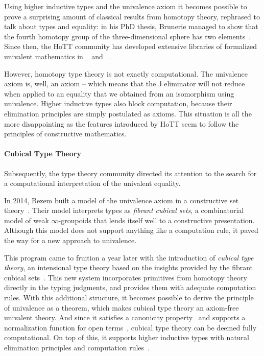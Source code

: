 Using higher inductive types and the univalence axiom it becomes possible to 
prove a surprising amount of classical results from homotopy theory, rephrased
to talk about types and equality:
% 
in his PhD thesis, Brunerie managed to show that the fourth homotopy group of
the three-dimensional sphere has two elements~.
% 
Since then, the HoTT community has developed extensive libraries of formalized
univalent mathematics in \Coq~ and
\Agda~.

However, homotopy type theory is not exactly computational. The univalence
axiom is, well, an axiom -- which means that the \( \mathsf{J} \) eliminator
will not reduce when applied to an equality that we obtained from an 
isomorphism using univalence.
% 
Higher inductive types also block computation, because their elimination 
principles are simply postulated as axioms.
% 
This situation is all the more disappointing as the features introduced by HoTT
seem to follow the principles of constructive mathematics.

\paragraph*{Cubical Type Theory}
% 
Subsequently, the type theory community directed its attention to the
search for a computational interpretation of the univalent equality. 

In 2014, Bezem \etal built a model of the univalence axiom in a constructive 
set theory~.
% 
Their model interprets types as \emph{fibrant cubical sets}, a combinatorial
model of weak \( \infty \)-groupoids that lends itself well to a constructive
presentation.
% 
Although this model does not support anything like a computation rule, 
it paved the way for a new approach to univalence.

This program came to fruition a year later with the introduction of 
\emph{cubical type theory}, an intensional type theory based on the insights 
provided by the fibrant cubical sets~.
% 
This new system incorporates primitives from homotopy theory directly in the typing 
judgments, and provides them with adequate computation rules.
% 
With this additional structure, it becomes possible to derive the principle of 
univalence as a theorem, which makes cubical type theory an axiom-free univalent 
theory.
% 
And since it satisfies a canonicity property~ and supports a
normalization function for open terms~, 
cubical type theory can be deemed fully computational.
% 
On top of this, it supports higher inductive types with
natural elimination principles and computation rules~.


